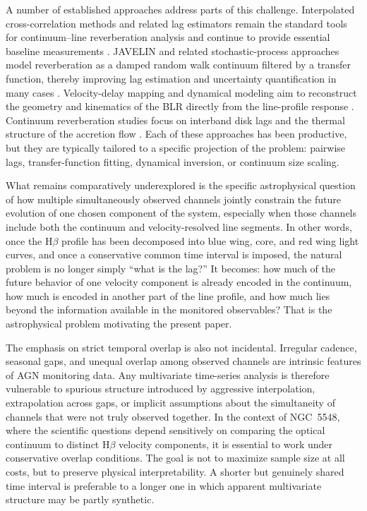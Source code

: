 \documentclass[12pt, a4paper]{article}
\begin{document}
A number of established approaches address parts of this challenge. Interpolated cross-correlation methods and related lag estimators remain the standard tools for continuum--line reverberation analysis and continue to provide essential baseline measurements \cite{Peterson2004,WhitePeterson1994}. JAVELIN and related stochastic-process approaches model reverberation as a damped random walk continuum filtered by a transfer function, thereby improving lag estimation and uncertainty quantification in many cases \cite{Zu2011,Zu2013}. Velocity-delay mapping and dynamical modeling aim to reconstruct the geometry and kinematics of the BLR directly from the line-profile response \cite{Pancoast2014,Horne2021}. Continuum reverberation studies focus on interband disk lags and the thermal structure of the accretion flow \cite{Fausnaugh2016,Fausnaugh2017,Edelson2019}. Each of these approaches has been productive, but they are typically tailored to a specific projection of the problem: pairwise lags, transfer-function fitting, dynamical inversion, or continuum size scaling.

What remains comparatively underexplored is the specific astrophysical question of how multiple simultaneously observed channels jointly constrain the future evolution of one chosen component of the system, especially when those channels include both the continuum and velocity-resolved line segments. In other words, once the H$\beta$ profile has been decomposed into blue wing, core, and red wing light curves, and once a conservative common time interval is imposed, the natural problem is no longer simply ``what is the lag?'' It becomes: how much of the future behavior of one velocity component is already encoded in the continuum, how much is encoded in another part of the line profile, and how much lies beyond the information available in the monitored observables? That is the astrophysical problem motivating the present paper.

The emphasis on strict temporal overlap is also not incidental. Irregular cadence, seasonal gaps, and unequal overlap among observed channels are intrinsic features of AGN monitoring data. Any multivariate time-series analysis is therefore vulnerable to spurious structure introduced by aggressive interpolation, extrapolation across gaps, or implicit assumptions about the simultaneity of channels that were not truly observed together. In the context of NGC~5548, where the scientific questions depend sensitively on comparing the optical continuum to distinct H$\beta$ velocity components, it is essential to work under conservative overlap conditions. The goal is not to maximize sample size at all costs, but to preserve physical interpretability. A shorter but genuinely shared time interval is preferable to a longer one in which apparent multivariate structure may be partly synthetic.
\end{document}
